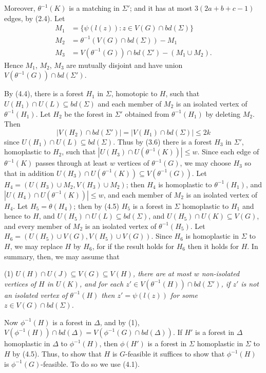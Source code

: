 Moreover, $\theta^{-1}(K)$ is a matching in $\Sigma'$; and it has at most $3(2a + b + c - 1)$ edges, by (2.4). Let
\begin{align*}
M_1 &= \{\psi(l(z)) \colon z \in V(G) \cap bd(\Sigma)\} \\
M_2 &= \theta^{-1}(V(G) \cap bd(\Sigma)) - M_1 \\
M_3 &= V(\theta^{-1}(G)) \cap bd(\Sigma') - (M_1 \cup M_2).
\end{align*}
Hence $M_1$, $M_2$, $M_3$ are mutually disjoint and have union $V(\theta^{-1}(G)) \cap bd(\Sigma')$.

By (4.4), there is a forest $H_1$ in $\Sigma$, homotopic to $H$, such that $U(H_1) \cap U(L) \subseteq bd(\Sigma)$ and each member of $M_2$ is an isolated vertex of $\theta^{-1}(H_1)$. Let $H_2$ be the forest in $\Sigma'$ obtained from $\theta^{-1}(H_1)$ by deleting $M_2$. Then
\begin{equation*}
|V(H_2) \cap bd(\Sigma')| = |V(H_1) \cap bd(\Sigma)| \le 2k
\end{equation*}
since $U(H_1) \cap U(L) \subseteq bd(\Sigma)$. Thus by (3.6) there is a forest $H_3$ in $\Sigma'$, homoplastic to $H_2$, such that $|U(H_3) \cap U(\theta^{-1}(K))| \le w$. Since each edge of $\theta^{-1}(K)$ passes through at least $w$ vertices of $\theta^{-1}(G)$, we may choose $H_3$ so that in addition $U(H_3) \cap U(\theta^{-1}(K)) \subseteq V(\theta^{-1}(G))$. Let $H_4 = (U(H_3) \cup M_2, V(H_3) \cup M_2)$; then $H_4$ is homoplastic to $\theta^{-1}(H_1)$, and $|U(H_4) \cap U(\theta^{-1}(K))| \le w$, and each member of $M_2$ is an isolated vertex of $H_4$. Let $H_5 = \theta(H_4)$; then by (4.5) $H_5$ is a forest in $\Sigma$ homoplastic to $H_1$ and hence to $H$, and $U(H_5) \cap U(L) \subseteq bd(\Sigma)$, and $U(H_5) \cap U(K) \subseteq V(G)$, and every member of $M_2$ is an isolated vertex of $\theta^{-1}(H_5)$. Let $H_6 = (U(H_5) \cup V(G), V(H_5) \cup V(G))$. Since $H_6$ is homoplastic in $\Sigma$ to $H$, we may replace $H$ by $H_6$, for if the result holds for $H_6$ then it holds for $H$. In summary, then, we may assume that

\hspace*{12pt}(1) \textit{$U(H) \cap U(J) \subseteq V(G) \subseteq V(H)$, there are at most $w$ non-isolated vertices of $H$ in $U(K)$, and for each $z' \in V(\theta^{-1}(H)) \cap bd(\Sigma')$, if $z'$ is not an isolated vertex of $\theta^{-1}(H)$ then $z' = \psi(l(z))$ for some $z \in V(G) \cap bd(\Sigma)$.}

Now $\phi^{-1}(H)$ is a forest in $\Delta$, and by (1), $V(\phi^{-1}(H)) \cap bd(\Delta) = V(\phi^{-1}(G) \cap bd(\Delta))$. If $H'$ is a forest in $\Delta$ homoplastic in $\Delta$ to $\phi^{-1}(H)$, then $\phi(H')$ is a forest in $\Sigma$ homoplastic in $\Sigma$ to $H$ by (4.5). Thus, to show that $H$ is $G$-feasible it suffices to show that $\phi^{-1}(H)$ is $\phi^{-1}(G)$-feasible. To do so we use (4.1).

